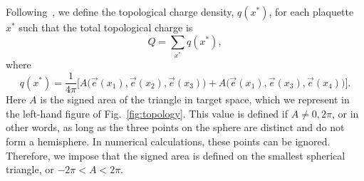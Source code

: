 \documentclass[a4paper,11pt]{article}
\newcommand{\e}{\vec e}
\begin{document}
Following~\cite{berg1981}, we define the topological charge density, $q(x^*)$, for each plaquette $x^*$ such that the total topological charge is
\begin{equation}
    Q = \sum_{x^*} q(x^*),
\end{equation}
where
\begin{equation}
    q(x^*) = \frac{1}{4\pi} \bigg[A\Big(\e(x_1), \e(x_2), \e(x_3)\Big) + A\Big(\e(x_1), \e(x_3), \e(x_4)\Big) \bigg].
\end{equation}
Here $A$ is the signed area of the triangle in target space, which we represent in the left-hand figure of Fig.~\ref{fig:topology}. This value is defined if $A\neq 0, 2\pi$, or in other words, as long as the three points on the sphere are distinct and do not form a hemisphere. In numerical calculations, these points can be ignored. Therefore, we impose that the signed area is defined on the smallest spherical triangle, or $-2\pi < A < 2\pi$.
\end{document}
